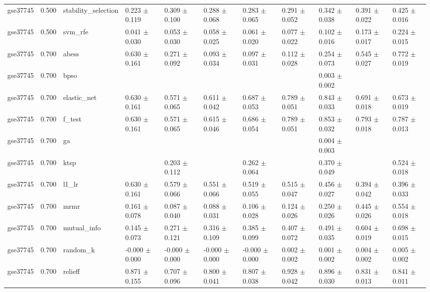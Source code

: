 \begin{table}[t]
\begin{tabular}{lllllllllll}
    gse37745 & 0.500 & stability\_selection & 0.223 $\pm$ 0.119 & 0.309 $\pm$ 0.100 & 0.288 $\pm$ 0.068 & 0.283 $\pm$ 0.065 & 0.291 $\pm$ 0.052 & 0.342 $\pm$ 0.038 & 0.391 $\pm$ 0.022 & 0.425 $\pm$ 0.016 \\
    gse37745 & 0.500 & svm\_rfe & 0.041 $\pm$ 0.030 & 0.053 $\pm$ 0.030 & 0.058 $\pm$ 0.025 & 0.061 $\pm$ 0.020 & 0.077 $\pm$ 0.022 & 0.102 $\pm$ 0.016 & 0.173 $\pm$ 0.017 & 0.224 $\pm$ 0.015 \\
    gse37745 & 0.700 & abess & 0.630 $\pm$ 0.161 & 0.271 $\pm$ 0.092 & 0.093 $\pm$ 0.034 & 0.097 $\pm$ 0.031 & 0.112 $\pm$ 0.028 & 0.254 $\pm$ 0.073 & 0.545 $\pm$ 0.027 & 0.772 $\pm$ 0.019 \\
    gse37745 & 0.700 & bpso &  &  &  &  &  & 0.003 $\pm$ 0.002 &  &  \\
    gse37745 & 0.700 & elastic\_net & 0.630 $\pm$ 0.161 & 0.571 $\pm$ 0.065 & 0.611 $\pm$ 0.042 & 0.687 $\pm$ 0.053 & 0.789 $\pm$ 0.051 & 0.843 $\pm$ 0.033 & 0.691 $\pm$ 0.018 & 0.673 $\pm$ 0.019 \\
    gse37745 & 0.700 & f\_test & 0.630 $\pm$ 0.161 & 0.571 $\pm$ 0.065 & 0.615 $\pm$ 0.046 & 0.686 $\pm$ 0.054 & 0.789 $\pm$ 0.051 & 0.853 $\pm$ 0.032 & 0.793 $\pm$ 0.018 & 0.787 $\pm$ 0.013 \\
    gse37745 & 0.700 & ga &  &  &  &  &  & 0.004 $\pm$ 0.003 &  &  \\
    gse37745 & 0.700 & ktsp &  & 0.203 $\pm$ 0.112 &  & 0.262 $\pm$ 0.064 &  & 0.370 $\pm$ 0.049 &  & 0.524 $\pm$ 0.018 \\
    gse37745 & 0.700 & l1\_lr & 0.630 $\pm$ 0.161 & 0.579 $\pm$ 0.066 & 0.551 $\pm$ 0.066 & 0.519 $\pm$ 0.055 & 0.515 $\pm$ 0.047 & 0.456 $\pm$ 0.027 & 0.394 $\pm$ 0.042 & 0.396 $\pm$ 0.033 \\
    gse37745 & 0.700 & mrmr & 0.161 $\pm$ 0.078 & 0.087 $\pm$ 0.040 & 0.088 $\pm$ 0.031 & 0.106 $\pm$ 0.028 & 0.124 $\pm$ 0.026 & 0.250 $\pm$ 0.026 & 0.445 $\pm$ 0.026 & 0.554 $\pm$ 0.018 \\
    gse37745 & 0.700 & mutual\_info & 0.145 $\pm$ 0.073 & 0.271 $\pm$ 0.121 & 0.316 $\pm$ 0.109 & 0.385 $\pm$ 0.099 & 0.407 $\pm$ 0.072 & 0.491 $\pm$ 0.035 & 0.604 $\pm$ 0.019 & 0.698 $\pm$ 0.015 \\
    gse37745 & 0.700 & random\_k & -0.000 $\pm$ 0.000 & -0.000 $\pm$ 0.000 & -0.000 $\pm$ 0.000 & -0.000 $\pm$ 0.000 & 0.002 $\pm$ 0.002 & 0.001 $\pm$ 0.002 & 0.004 $\pm$ 0.002 & 0.005 $\pm$ 0.002 \\
    gse37745 & 0.700 & relieff & 0.871 $\pm$ 0.155 & 0.707 $\pm$ 0.096 & 0.800 $\pm$ 0.041 & 0.807 $\pm$ 0.038 & 0.928 $\pm$ 0.042 & 0.896 $\pm$ 0.030 & 0.831 $\pm$ 0.013 & 0.841 $\pm$ 0.011 \\

\end{tabular}
\end{table}
